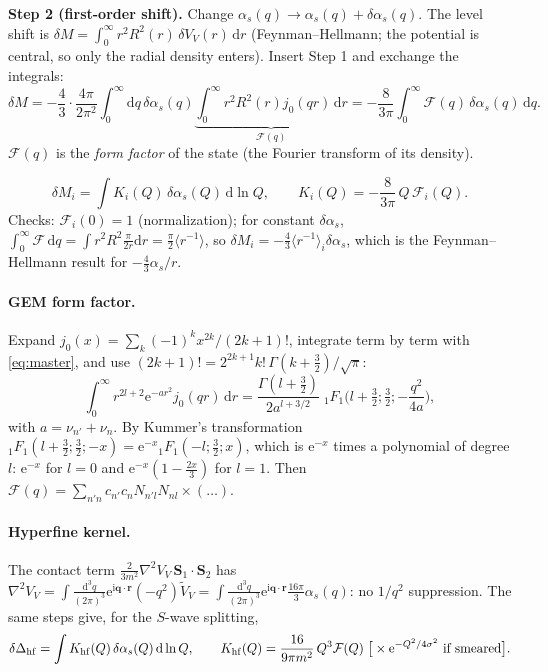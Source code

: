 \documentclass[11pt,a4paper]{article}
\numberwithin{equation}{section}
\theoremstyle{definition}
\theoremstyle{plain}
\theoremstyle{remark}
\newenvironment{keyresult}[1][Key result]{\begin{tcolorbox}[keybox,title={\small\bfseries #1},fonttitle=\small,coltitle=white,colbacktitle=MidnightBlue!70]}{\end{tcolorbox}}
\numberwithin{algorithm}{section}
\newcommand{\vr}{\bm r}
\newcommand{\vq}{\bm q}
\newcommand{\vS}{\bm S}
\newcommand{\as}{\alpha_s}
\newcommand{\dd}{\mathrm{d}}
\newcommand{\ii}{\mathrm{i}}
\newcommand{\ee}{\mathrm{e}}
\begin{document}
\textbf{Step 2 (first-order shift).} Change $\as(q)\to\as(q)+\delta\as(q)$. The level shift is $\delta M=\int_0^\infty r^2R^2(r)\,\delta V_V(r)\,\dd r$ (Feynman--Hellmann; the potential is central, so only the radial density enters). Insert Step 1 and exchange the integrals:
\begin{equation}
\delta M=-\frac43\cdot\frac{4\pi}{2\pi^2}\int_0^\infty\dd q\,\delta\as(q)\underbrace{\int_0^\infty r^2R^2(r)j_0(qr)\,\dd r}_{\mathcal F(q)}=-\frac{8}{3\pi}\int_0^\infty\mathcal F(q)\,\delta\as(q)\,\dd q .
\end{equation}
$\mathcal F(q)$ is the \emph{form factor} of the state (the Fourier transform of its density).
\begin{keyresult}[Sensitivity of a level to the coupling at scale $Q$]
\begin{equation}
\delta M_i=\int K_i(Q)\,\delta\as(Q)\,\dd\ln Q,\qquad K_i(Q)=-\frac{8}{3\pi}\,Q\,\mathcal F_i(Q).
\label{eq:kernel}
\end{equation}
Checks: $\mathcal F_i(0)=1$ (normalization); for constant $\delta\as$, $\int_0^\infty\mathcal F\,\dd q=\int r^2R^2\frac{\pi}{2r}\dd r=\frac\pi2\langle r^{-1}\rangle$, so $\delta M_i=-\frac43\langle r^{-1}\rangle_i\delta\as$, which is the Feynman--Hellmann result for $-\frac43\as/r$.
\end{keyresult}
\paragraph{GEM form factor.} Expand $j_0(x)=\sum_k(-1)^kx^{2k}/(2k+1)!$, integrate term by term with \eqref{eq:master}, and use $(2k+1)!=2^{2k+1}k!\,\Gamma(k+\frac32)/\sqrt\pi$:
\begin{equation}
\int_0^\infty r^{2l+2}\ee^{-ar^2}j_0(qr)\,\dd r=\frac{\Gamma(l+\frac32)}{2a^{l+3/2}}\;{}_1F_1\Big(l+\tfrac32;\tfrac32;-\frac{q^2}{4a}\Big),
\end{equation}
with $a=\nu_{n'}+\nu_n$. By Kummer's transformation ${}_1F_1(l+\frac32;\frac32;-x)=\ee^{-x}{}_1F_1(-l;\frac32;x)$, which is $\ee^{-x}$ times a polynomial of degree $l$: $\ee^{-x}$ for $l=0$ and $\ee^{-x}(1-\frac{2x}3)$ for $l=1$. Then $\mathcal F(q)=\sum_{n'n}c_{n'}c_nN_{n'l}N_{nl}\times(\dots)$.

\paragraph{Hyperfine kernel.} The contact term $\frac{2}{3m^2}\nabla^2V_V\,\vS_1\cdot\vS_2$ has $\nabla^2V_V=\int\frac{\dd^3q}{(2\pi)^3}\ee^{\ii\vq\cdot\vr}(-q^2)\tilde V_V=\int\frac{\dd^3q}{(2\pi)^3}\ee^{\ii\vq\cdot\vr}\frac{16\pi}3\as(q)$: no $1/q^2$ suppression. The same steps give, for the $S$-wave splitting,
\begin{equation}
\delta\Delta_{\rm hf}=\int K_{\rm hf}(Q)\,\delta\as(Q)\,\dd\ln Q,\qquad K_{\rm hf}(Q)=\frac{16}{9\pi m^2}\,Q^3\mathcal F(Q)\;\big[\times\ee^{-Q^2/4\sigma^2}\text{ if smeared}\big].
\end{equation}
\end{document}

